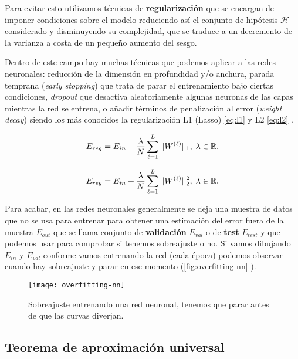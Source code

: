 Para evitar esto utilizamos técnicas de \textbf{regularización} que se encargan de imponer condiciones sobre el modelo reduciendo así el conjunto de hipótesis $\mathcal{H}$ considerado y disminuyendo su complejidad, que se traduce a un decremento de la varianza a costa de un pequeño aumento del sesgo.

Dentro de este campo hay muchas técnicas que podemos aplicar a las redes neuronales: reducción de la dimensión en profundidad y/o anchura, parada temprana (\emph{early stopping}) que trata de parar el entrenamiento bajo ciertas condiciones, \emph{dropout} \cite{hertz2018introduction, hinton2012improving} que desactiva aleatoriamente algunas neuronas de las capas mientras la red se entrena, o añadir términos de penalización al error (\emph{weight decay}) siendo los más conocidos la regularización L1 (Lasso) \eqref{eq:l1} y L2 \eqref{eq:l2} \cite{krogh1992simple}.

\begin{equation}
  E_{reg} = E_{in} + \dfrac{\lambda}{N} \sum \limits^{L}_{\ell = 1} ||W^{(\ell)}||_1, \; \lambda \in \mathbb{R}.
  \label{eq:l1}
\end{equation}

\begin{equation}
  E_{reg} = E_{in} + \dfrac{\lambda}{N} \sum \limits^{L}_{\ell = 1} ||W^{(\ell)}||_2^2, \; \lambda \in \mathbb{R}.
  \label{eq:l2}
\end{equation}

Para acabar, en las redes neuronales generalmente se deja una muestra de datos que no se usa para entrenar para obtener una estimación del error fuera de la muestra $E_{out}$ que se llama conjunto de \textbf{validación} $E_{val}$ o de \textbf{test} $E_{test}$ y que podemos usar para comprobar si tenemos sobreajuste o no. Si vamos dibujando $E_{in}$ y $E_{val}$ conforme vamos entrenando la red (cada época) podemos observar cuando hay sobreajuste y parar en ese momento (\autoref{fig:overfitting-nn} \cite{julien2018overfitting}).

\begin{figure}[htpb]
  \centering
  \texttt{[image: overfitting-nn]}
  \caption{Sobreajuste entrenando una red neuronal, tenemos que parar antes de que las curvas diverjan.}
  \label{fig:overfitting-nn}
\end{figure}


\subsection{Teorema de aproximación universal}

